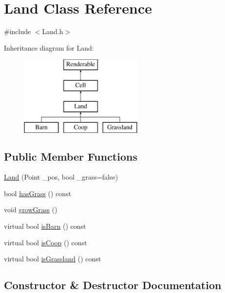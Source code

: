 \hypertarget{classLand}{}\section{Land Class Reference}
\label{classLand}


{\ttfamily \#include $<$Land.\+h$>$}

Inheritance diagram for Land\+:\begin{figure}[H]
\begin{center}
\leavevmode
\includegraphics[height=4.000000cm]{classLand}
\end{center}
\end{figure}
\subsection*{Public Member Functions}
\begin{DoxyCompactItemize}
\item 
\mbox{\hyperlink{classLand_a4942363111df14e29373af33038cf32b}{Land}} (Point \+\_\+pos, bool \+\_\+grass=false)
\item 
bool \mbox{\hyperlink{classLand_aecde97d7ed842f3bf3fdff52a6057cc5}{has\+Grass}} () const
\item 
void \mbox{\hyperlink{classLand_a8324641dc1cfdf2500a345441998c18d}{grow\+Grass}} ()
\item 
virtual bool \mbox{\hyperlink{classLand_a0e7a4fa66fb495bada48ac00974bf5a7}{is\+Barn}} () const
\item 
virtual bool \mbox{\hyperlink{classLand_a685f9ec0e771dbf0fe348dd13d467c4e}{is\+Coop}} () const
\item 
virtual bool \mbox{\hyperlink{classLand_aa79c16746d74c0493e66ce73f2fa0e0f}{is\+Grassland}} () const
\end{DoxyCompactItemize}


\subsection{Constructor \& Destructor Documentation}
\mbox{\label{classLand_a4942363111df14e29373af33038cf32b}} 
